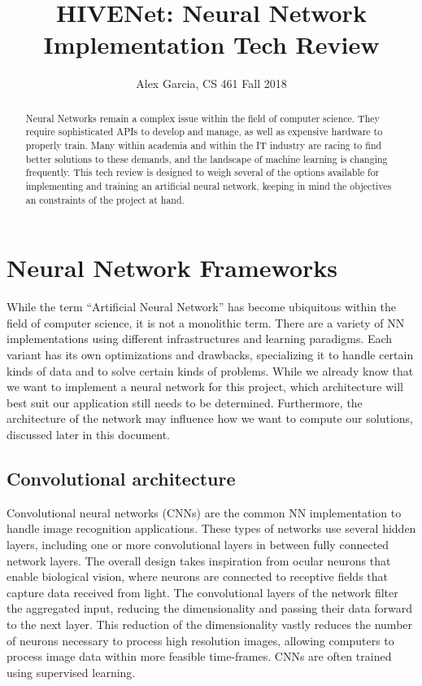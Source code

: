 \documentclass[onecolumn, draftclsnofoot,10pt, compsoc]{IEEEtran}
\title{HIVENet: Neural Network Implementation Tech Review}
\author{Alex Garcia, CS 461 Fall 2018}
\begin{document}
\begin{titlepage}
\maketitle
    \begin{abstract}
    Neural Networks remain a complex issue within the field of computer science. They require sophisticated APIs to develop and manage, as well as expensive hardware to properly train. Many within academia and within the IT industry are racing to find better solutions to these demands, and the landscape of machine learning is changing frequently. This tech review is designed to weigh several of the options available for implementing and training an artificial neural network, keeping in mind the objectives an constraints of the project at hand.
    \end{abstract}
\end{titlepage}

    \section{Neural Network Frameworks}
    While the term “Artificial Neural Network” has become ubiquitous within the field of computer science, it is not a monolithic term. There are a variety of NN implementations using different infrastructures and learning paradigms. Each variant has its own optimizations and drawbacks, specializing it to handle certain kinds of data and to solve certain kinds of problems. While we already know that we want to implement a neural network for this project, which architecture will best suit our application still needs to be determined. Furthermore, the architecture of the network may influence how we want to compute our solutions, discussed later in this document.
    \subsection{Convolutional architecture}
    Convolutional neural networks (CNNs) are the common NN implementation to handle image recognition applications. These types of networks use several hidden layers, including one or more convolutional layers in between fully connected network layers. The overall design takes inspiration from ocular neurons that enable biological vision, where neurons are connected to receptive fields that capture data received from light. The convolutional layers of the network filter the aggregated input, reducing the dimensionality and passing their data forward to the next layer. This reduction of the dimensionality vastly reduces the number of neurons necessary to process high resolution images, allowing computers to process image data within more feasible time-frames. CNNs are often trained using supervised learning.
\end{document}
